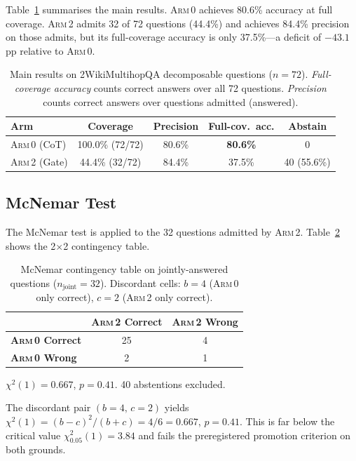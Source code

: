 \documentclass[11pt]{article}
\newcommand{\armi}{\textsc{Arm\,0}}
\newcommand{\armii}{\textsc{Arm\,2}}
\newcommand{\mcnem}{McNemar}
\begin{document}
Table~\ref{tab:main} summarises the main results.  \armi{} achieves
80.6\% accuracy at full coverage.  \armii{} admits 32 of 72 questions
(44.4\%) and achieves 84.4\% precision on those admits, but its full-coverage
accuracy is only 37.5\%---a deficit of $-43.1$ pp relative to \armi{}.

\begin{table}[h]
\centering
\caption{Main results on 2WikiMultihopQA decomposable questions ($n=72$).
  \emph{Full-coverage accuracy} counts correct answers over all 72 questions.
  \emph{Precision} counts correct answers over questions admitted (answered).}
\label{tab:main}
\begin{tabular}{lcccc}
\toprule
\textbf{Arm} & \textbf{Coverage} & \textbf{Precision} & \textbf{Full-cov.\ acc.} & \textbf{Abstain} \\
\midrule
\armi{} (CoT)   & 100.0\% (72/72) & 80.6\% & \textbf{80.6\%} & 0 \\
\armii{} (Gate) & 44.4\% (32/72)  & 84.4\% & 37.5\% & 40 (55.6\%) \\
\bottomrule
\end{tabular}
\end{table}

\subsection{\mcnem{} Test}

The \mcnem{} test is applied to the 32 questions admitted by \armii{}.
Table~\ref{tab:mcnemar} shows the 2$\times$2 contingency table.

\begin{table}[h]
\centering
\caption{\mcnem{} contingency table on jointly-answered questions ($n_\text{joint}=32$).
  Discordant cells: $b=4$ (\armi{} only correct), $c=2$ (\armii{} only correct).}
\label{tab:mcnemar}
\begin{tabular}{lcc}
\toprule
 & \textbf{\armii{} Correct} & \textbf{\armii{} Wrong} \\
\midrule
\textbf{\armi{} Correct} & 25 & 4 \\
\textbf{\armi{} Wrong}   & 2  & 1 \\
\bottomrule
\end{tabular}
\vspace{2pt}
\footnotesize{$\chi^2(1)=0.667$, $p=0.41$. 40 abstentions excluded.}
\end{table}

The discordant pair $(b{=}4,\,c{=}2)$ yields $\chi^2(1) = (b-c)^2/(b+c) = 4/6 = 0.667$,
$p = 0.41$.  This is far below the critical value $\chi^2_{0.05}(1) = 3.84$
and fails the preregistered promotion criterion on both grounds.
\end{document}
